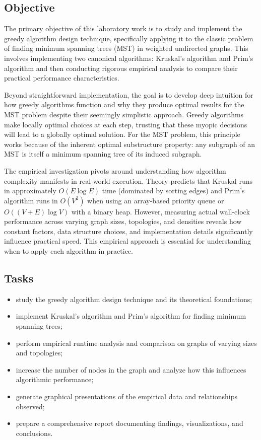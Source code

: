 ﻿\documentclass[12pt]{article}
\begin{document}
\subsection{Objective}

The primary objective of this laboratory work is to study and implement the greedy algorithm design technique, specifically applying it to the classic problem of finding minimum spanning trees (MST) in weighted undirected graphs. This involves implementing two canonical algorithms: Kruskal's algorithm and Prim's algorithm and then conducting rigorous empirical analysis to compare their practical performance characteristics.

Beyond straightforward implementation, the goal is to develop deep intuition for how greedy algorithms function and why they produce optimal results for the MST problem despite their seemingly simplistic approach. Greedy algorithms make locally optimal choices at each step, trusting that these myopic decisions will lead to a globally optimal solution. For the MST problem, this principle works because of the inherent optimal substructure property: any subgraph of an MST is itself a minimum spanning tree of its induced subgraph.

The empirical investigation pivots around understanding how algorithm complexity manifests in real-world execution. Theory predicts that Kruskal runs in approximately $O(E \log E)$ time (dominated by sorting edges) and Prim's algorithm runs in $O(V^2)$ when using an array-based priority queue or $O((V+E)\log V)$ with a binary heap. However, measuring actual wall-clock performance across varying graph sizes, topologies, and densities reveals how constant factors, data structure choices, and implementation details significantly influence practical speed. This empirical approach is essential for understanding when to apply each algorithm in practice.

\subsection{Tasks}

\begin{itemize}[itemsep=1pt]
  \item study the greedy algorithm design technique and its theoretical foundations;
  \item implement Kruskal's algorithm and Prim's algorithm for finding minimum spanning trees;
  \item perform empirical runtime analysis and comparison on graphs of varying sizes and topologies;
  \item increase the number of nodes in the graph and analyze how this influences algorithmic performance;
  \item generate graphical presentations of the empirical data and relationships observed;
  \item prepare a comprehensive report documenting findings, visualizations, and conclusions.
\end{itemize}
\end{document}
